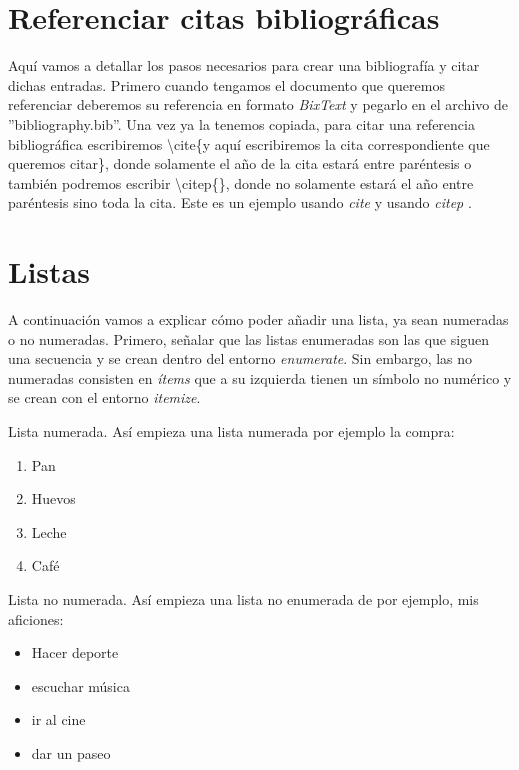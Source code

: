 \section{Referenciar citas bibliográficas}
 Aquí vamos a detallar los pasos necesarios para crear una bibliografía y citar dichas entradas. Primero cuando tengamos el documento que queremos referenciar deberemos su referencia en formato \textit{BixText} y pegarlo en el archivo de ''bibliography.bib''. Una vez ya la tenemos copiada, para citar una referencia bibliográfica escribiremos \textbackslash cite\{y aquí escribiremos la cita correspondiente que queremos citar\}, donde solamente el año de la cita estará entre paréntesis o también podremos escribir \textbackslash citep\{\}, donde no solamente estará el año entre paréntesis sino toda la cita. Este es un ejemplo usando \textit{cite} \cite{mota2018augmented} y usando \textit{citep} \citep{mota2018augmented}.




\section{Listas} 
A continuación vamos a explicar cómo poder añadir una lista, ya sean numeradas o no numeradas. Primero, señalar que las listas enumeradas son las que siguen una secuencia y se crean dentro del entorno \textit{enumerate}. Sin embargo, las no numeradas consisten en \textit{ítems} que a su izquierda tienen un símbolo no numérico y se crean con el entorno \textit{itemize}.

 Lista numerada. Así empieza una lista numerada por ejemplo la compra:
    \begin{enumerate} 
     \item Pan
     \item Huevos
     \item Leche
     \item Café
 \end{enumerate} %
 
 Lista no numerada. Así empieza una lista no enumerada de por ejemplo, mis aficiones: 
 \begin{itemize} 
     \item Hacer deporte
     \item escuchar música
     \item ir al cine 
     \item dar un paseo 
 \end{itemize} %

